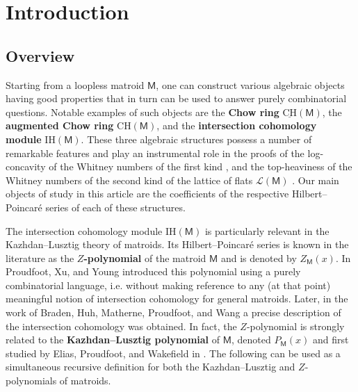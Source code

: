 \documentclass[11pt, a4paper, english]{amsart}
\theoremstyle{teoremas}
\theoremstyle{definition}
\newcommand{\M}{\mathsf{M}}
\newcommand{\CH}{\mathrm{CH}}
\newcommand{\IH}{\mathrm{IH}}
\newcommand{\uCH}{\underline{\mathrm{CH}}}
\begin{document}
\section{Introduction}\label{sec:introduction}

\subsection{Overview} Starting from a loopless matroid $\M$, one can construct various algebraic objects having good properties that in turn can be used to answer purely combinatorial questions. Notable examples of such objects are the \textbf{Chow ring} $\uCH(\M)$, the \textbf{augmented Chow ring} $\CH(\M)$, and the \textbf{intersection cohomology module} $\IH(\M)$. These three algebraic structures possess a number of remarkable features and play an instrumental role in the proofs of the log-concavity of the Whitney numbers of the first kind \cite{adiprasito-huh-katz}, and the top-heaviness of the Whitney numbers of the second kind of the lattice of flats $\mathcal{L}(\M)$ \cite{braden-huh-matherne-proudfoot-wang}. Our main objects of study in this article are the coefficients of the respective Hilbert--Poincar\'e series of each of these structures. 

The intersection cohomology module $\IH(\M)$ is particularly relevant in the Kazhdan--Lusztig theory of matroids. Its Hilbert--Poincar\'e series is known in the literature as the \textbf{$Z$-polynomial} of the matroid $\M$ and is denoted by $Z_{\M}(x)$. In \cite{proudfoot-xu-young} Proudfoot, Xu, and Young introduced this polynomial using a purely combinatorial language, i.e. without making reference to any (at that point) meaningful notion of intersection cohomology for general matroids. Later, in the work of Braden, Huh, Matherne, Proudfoot, and Wang a precise description of the intersection cohomology was obtained. In fact, the $Z$-polynomial is strongly related to the \textbf{Kazhdan--Lusztig polynomial} of $\M$, denoted $P_\M(x)$ and first studied by Elias, Proudfoot, and Wakefield in \cite{elias-proudfoot-wakefield}. The following can be used as a simultaneous recursive definition for both the Kazhdan--Lusztig and $Z$-polynomials of matroids.
\end{document}
